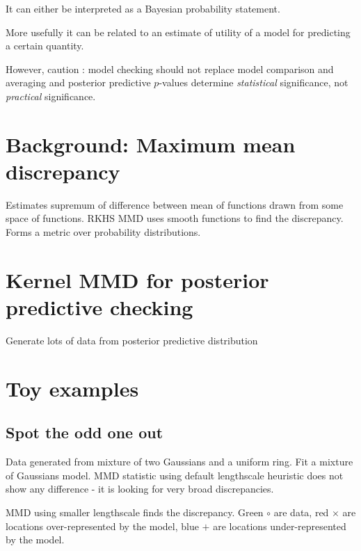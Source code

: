 \documentclass{article}
\begin{document}
It can either be interpreted as a Bayesian probability statement.

More usefully it can be related to an estimate of utility of a model for predicting a certain quantity.

However, caution : model checking should not replace model comparison and averaging and posterior predictive $p$-values determine \emph{statistical} significance, not \emph{practical} significance.

\section{Background: Maximum mean discrepancy}

Estimates supremum of difference between mean of functions drawn from some space of functions.
RKHS MMD uses smooth functions to find the discrepancy.
Forms a metric over probability distributions.

\section{Kernel MMD for posterior predictive checking}

Generate lots of data from posterior predictive distribution

\section{Toy examples}

\subsection{Spot the odd one out}

Data generated from mixture of two Gaussians and a uniform ring.
Fit a mixture of Gaussians model.
MMD statistic using default lengthscale heuristic does not show any difference - it is looking for very broad discrepancies.

MMD using smaller lengthscale finds the discrepancy.
Green $\circ$ are data, red $\times$ are locations over-represented by the model, blue $+$ are locations under-represented by the model.
\end{document}
